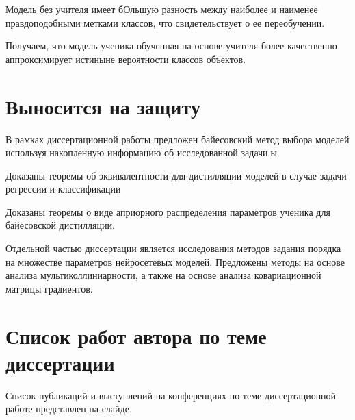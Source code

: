 \documentclass[10pt, twoside]{article}
\begin{document}
Модель без учителя имеет бОльшую разность между наиболее и наименее правдоподобными метками классов, что свидетельствует о ее переобучении.

Получаем, что модель ученика обученная на основе учителя более качественно аппроксимирует истиныне вероятности классов объектов.

\section{Выносится на защиту}
В рамках диссертационной работы предложен байесовский метод выбора моделей используя накопленную информацию об исследованной задачи.ы

Доказаны теоремы об эквивалентности для дистилляции моделей в случае задачи регрессии и классификации

Доказаны теоремы о виде априорного распределения параметров ученика для байесовской дистилляции.

Отдельной частью диссертации является исследования методов задания порядка на множестве параметров нейросетевых моделей. Предложены методы на основе анализа мультиколлиниарности, а также на основе анализа ковариационной матрицы градиентов.

\section{Список работ автора по теме диссертации}
Список публикаций и выступлений на конференциях по теме диссертационной работе представлен на слайде.
\end{document}
